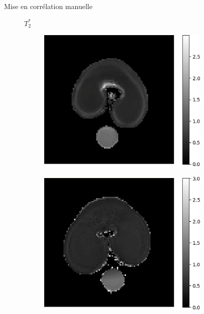 \documentclass[10pt]{beamer}
\begin{document}
\begin{frame}{Mise en corrélation manuelle}
  
  \begin{figure}
    \centering
    $T_2^*$
    \begin{subfigure}[c]{0.33\textwidth}
      \centering
      \includegraphics[width=0.9\textwidth]{fig/manualcorr_irm250_t2.png}
      \caption{}
      \label{subfig:manualcorr_irm250_t2.png}
    \end{subfigure}%
    \begin{subfigure}[c]{0.33\textwidth}
      \centering
      \includegraphics[width=0.9\textwidth]{fig/manualcorr_irm650_t2}
      \caption{}
      \label{subfig:manualcorr_irm650_t2}
    \end{subfigure}


\end{figure}
\end{frame}
\end{document}
